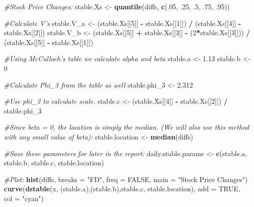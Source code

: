 \documentclass[]{article}
\newenvironment{Shaded}{\begin{snugshade}}{\end{snugshade}}
\newcommand{\CommentTok}[1]{\textcolor[rgb]{0.56,0.35,0.01}{\textit{#1}}}
\newcommand{\DataTypeTok}[1]{\textcolor[rgb]{0.13,0.29,0.53}{#1}}
\newcommand{\DecValTok}[1]{\textcolor[rgb]{0.00,0.00,0.81}{#1}}
\newcommand{\FloatTok}[1]{\textcolor[rgb]{0.00,0.00,0.81}{#1}}
\newcommand{\KeywordTok}[1]{\textcolor[rgb]{0.13,0.29,0.53}{\textbf{#1}}}
\newcommand{\NormalTok}[1]{#1}
\newcommand{\OperatorTok}[1]{\textcolor[rgb]{0.81,0.36,0.00}{\textbf{#1}}}
\newcommand{\OtherTok}[1]{\textcolor[rgb]{0.56,0.35,0.01}{#1}}
\newcommand{\StringTok}[1]{\textcolor[rgb]{0.31,0.60,0.02}{#1}}
\begin{document}
\begin{Shaded}
\begin{Highlighting}[]
\CommentTok{#Stock Price Changes:}
\NormalTok{stable.Xs <-}\StringTok{ }\KeywordTok{quantile}\NormalTok{(diffs, }\KeywordTok{c}\NormalTok{(.}\DecValTok{05}\NormalTok{, }\FloatTok{.25}\NormalTok{, }\FloatTok{.5}\NormalTok{, }\FloatTok{.75}\NormalTok{, }\FloatTok{.95}\NormalTok{))}

\CommentTok{#Calculate V's}
\NormalTok{stable.V_a <-}\StringTok{ }\NormalTok{(stable.Xs[[}\DecValTok{5}\NormalTok{]] }\OperatorTok{-}\StringTok{ }\NormalTok{stable.Xs[[}\DecValTok{1}\NormalTok{]]) }\OperatorTok{/}\StringTok{ }\NormalTok{(stable.Xs[[}\DecValTok{4}\NormalTok{]] }\OperatorTok{-}\StringTok{ }\NormalTok{stable.Xs[[}\DecValTok{2}\NormalTok{]])}
\NormalTok{stable.V_b <-}\StringTok{ }\NormalTok{(stable.Xs[[}\DecValTok{5}\NormalTok{]] }\OperatorTok{+}\StringTok{ }\NormalTok{stable.Xs[[}\DecValTok{3}\NormalTok{]] }\OperatorTok{-}\StringTok{ }\NormalTok{(}\DecValTok{2}\OperatorTok{*}\NormalTok{stable.Xs[[}\DecValTok{3}\NormalTok{]])) }\OperatorTok{/}\StringTok{ }\NormalTok{(stable.Xs[[}\DecValTok{5}\NormalTok{]] }\OperatorTok{-}\StringTok{ }\NormalTok{stable.Xs[[}\DecValTok{1}\NormalTok{]])}

\CommentTok{#Using McCulloch's table we calculate alpha and beta}
\NormalTok{stable.a <-}\StringTok{ }\FloatTok{1.13}
\NormalTok{stable.b <-}\StringTok{ }\DecValTok{0}

\CommentTok{#Calculate Phi_3 from the table as well}
\NormalTok{stable.phi_}\DecValTok{3}\NormalTok{ <-}\StringTok{ }\FloatTok{2.312}

\CommentTok{#Use phi_3 to calculate scale.}
\NormalTok{stable.c <-}\StringTok{ }\NormalTok{(stable.Xs[[}\DecValTok{4}\NormalTok{]] }\OperatorTok{-}\StringTok{ }\NormalTok{stable.Xs[[}\DecValTok{2}\NormalTok{]]) }\OperatorTok{/}\StringTok{ }\NormalTok{stable.phi_}\DecValTok{3}

\CommentTok{#Since beta = 0, the location is simply the median. (We will also use this method with any small value of beta):}
\NormalTok{stable.location <-}\StringTok{ }\KeywordTok{median}\NormalTok{(diffs)}

\CommentTok{#Save these parameters for later in the report:}
\NormalTok{daily.stable.params <-}\StringTok{ }\KeywordTok{c}\NormalTok{(stable.a, stable.b, stable.c, stable.location)}

\CommentTok{#Plot:}
\KeywordTok{hist}\NormalTok{(diffs, }\DataTypeTok{breaks =} \StringTok{"FD"}\NormalTok{, }\DataTypeTok{freq =} \OtherTok{FALSE}\NormalTok{, }\DataTypeTok{main =} \StringTok{"Stock Price Changes"}\NormalTok{)}
\KeywordTok{curve}\NormalTok{(}\KeywordTok{dstable}\NormalTok{(x, (stable.a),(stable.b),stable.c, stable.location), }\DataTypeTok{add =} \OtherTok{TRUE}\NormalTok{, }\DataTypeTok{col =} \StringTok{"cyan"}\NormalTok{)}
\end{Highlighting}
\end{Shaded}
\end{document}
